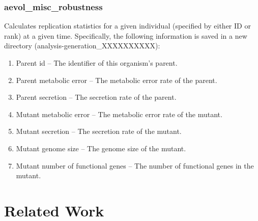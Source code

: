 \subsubsection{aevol\_misc\_robustness}

Calculates replication statistics for a given individual (specified by either ID or rank) at a given time.  Specifically, the following information is saved in a new directory (analysis-generation\_XXXXXXXXXX):
\begin{enumerate}
	\item Parent id – The identifier of this organism’s parent.
	\item Parent metabolic error – The metabolic error rate of the parent.
	\item Parent secretion – The secretion rate of the parent.
	\item Mutant metabolic error – The metabolic error rate of the mutant.
	\item Mutant secretion – The secretion rate of the mutant.
	\item Mutant genome size – The genome size of the mutant.
	\item Mutant number of functional genes – The number of functional genes in the mutant.
\end{enumerate}


\section{Related Work}\label{related_work}
